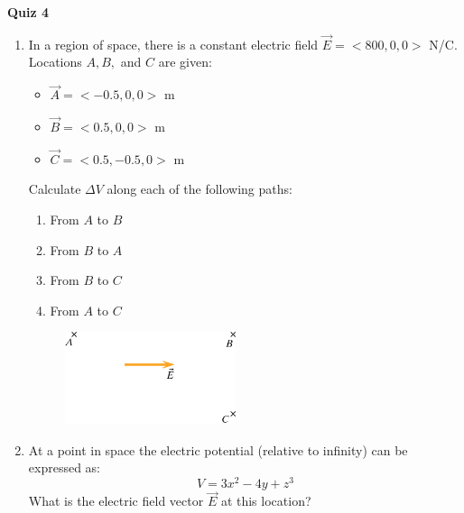 \documentclass{article}
\begin{document}
\fancyfoot[C]{\thepage}
\vspace*{0cm}
\begin{center}
	{\LARGE \textbf{Quiz 4}}
\end{center}

\begin{enumerate}
	\item In a region of space, there is a constant electric field $\vec{E}=<800,0,0>$ N/C. Locations $A, B, $ and $C$ are given:
	\begin{itemize}
		\item $\vec{A}=<-0.5,0,0>$ m
		\item $\vec{B}=<0.5,0,0>$ m
		\item $\vec{C}=<0.5,-0.5,0>$ m
	\end{itemize}

	Calculate $\Delta V$ along each of the following paths:
	\begin{enumerate}
		\item From $A$ to $B$
		\item From $B$ to $A$
		\item From $B$ to $C$
		\item From $A$ to $C$
	\end{enumerate}
	
	\begin{figure}[ht!]
		\centering
		\includegraphics[width=5cm]{Ch16jpegs/fig16_65.jpg}
	\end{figure}
\vspace{7cm}
\item At a point in space the electric potential (relative to infinity) can be expressed as:
\begin{equation*}
V = 3x^2 -4y + z^3
\end{equation*}
What is the electric field vector $\vec{E}$ at this location?
\end{enumerate}
\end{document}
